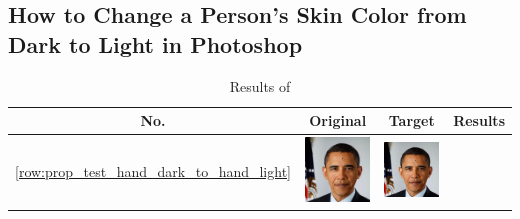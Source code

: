 \documentclass[12pt, a4paper]{article}
\begin{document}
\subsection{How to Change a Person's Skin Color from Dark to Light in Photoshop}
\begin{longtable}{|c||c|c|c|}
    \caption{Results of }\\
    \hline
    No. & Original & Target & Results \\
    \hline  \ref{row:prop_test_hand_dark_to_hand_light} &
  \begin{minipage}{.29\textwidth}
    \includegraphics[width=\textwidth,height=\textheight,keepaspectratio]{images/obama_orig}
  \end{minipage} & 
  \begin{minipage}{.29\textwidth}
    \includegraphics[width=\textwidth,height=\textheight,keepaspectratio]{images/obama_orig}

\end{minipage}
\end{longtable}
\end{document}

